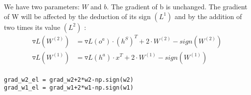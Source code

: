 \documentclass[12pt]{article}
\begin{document}
\subsection{}
We have two parameters: $W$ and $b$. The gradient of b is unchanged. The gradient of W will be affected by the deduction of its sign $(L^1)$ and by the addition of two times its value $(L^2)$ :
\begin{align*} 
\triangledown L(W^{(2)}) & = \triangledown L(o^a) \cdot (h^S)^T + 2 \cdot W^{(2)} - sign(W^{(2)}) \\
\triangledown L(W^{(1)}) & = \triangledown L(h^a) \cdot x^T + 2 \cdot W^{(1)} - sign(W^{(1)}) \\
\end{align*}
\begin{lstlisting}
grad_w2_el = grad_w2+2*w2-np.sign(w2)
grad_w1_el = grad_w1+2*w1-np.sign(w1)
\end{lstlisting}
\end{document}
